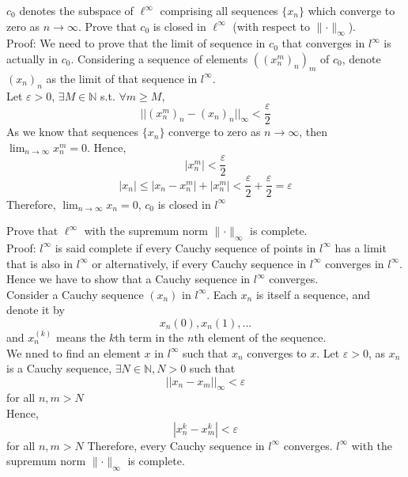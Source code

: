 \documentclass [12pt,letterpaper]{exam}
\begin{document}
\begin{questions}
\question %
$c_0$ denotes the subspace of $\ell^{\infty}$ comprising all sequences $\{ x_n\}$ which converge to zero as $n\to\infty$.
Prove that $c_0$ is closed in $\ell^{\infty}$ (with respect to $\lVert\cdot\rVert_{\infty}$).\\

Proof: We need to prove that the limit of sequence in $c_0$ that converges in $l^\infty$ is actually in $c_0$. Considering a sequence of elements $((x_{n}^{m})_n)_m$ of $c_0$, denote $(x_n)_n$ as the limit of that sequence in $l^\infty$.\\
Let $\varepsilon > 0$, $\exists M \in \mathbb{N}$ s.t. $\forall m \geq M$, 
$$||(x_{n}^{m})_{n} - (x_n)_n||_{\infty} < \frac{\varepsilon}{2}$$
As we know that sequences $\big\{ x_n \big\}$ converge to zero as $n \rightarrow \infty$, then $\lim_{n \rightarrow \infty}x_{n}^{m} = 0$. Hence, $$|x_{n}^{m}| < \frac{\varepsilon}{2}$$
$$|x_n| \leq |x_n - x_{n}^{m}| + |x_{n}^{m}| < \frac{\varepsilon}{2} + \frac{\varepsilon}{2} = \varepsilon$$
Therefore, $\lim_{n \rightarrow \infty}x_n = 0$, $c_0$ is closed in $l^\infty$

\question %
Prove that $\ell^{\infty}$ with the supremum norm $\lVert\cdot\rVert_{\infty}$ is complete.\\

Proof: $l^\infty$ is said complete if every Cauchy sequence of points in $l^\infty$ has a limit that is also in $l^{\infty}$ or alternatively, if every Cauchy sequence in $l^\infty$ converges in $l^\infty$. Hence we have to show that a Cauchy sequence in $l^\infty$ converges.\\
Consider a Cauchy sequence $(x_n)$ in $l^\infty$. Each $x_n$ is itself a sequence, and denote it by $$x_n(0), x_n(1),...$$
and $x_n^(k)$ means the $k$th term in the $n$th element of the sequence.\\
We nned to find an element $x$ in $l^\infty$ such that $x_n$ converges to $x$.
Let $\varepsilon > 0$, as $x_n$ is a Cauchy sequence, $\exists N \in \mathbb{N}, N > 0$ such that $$||x_n - x_m||_\infty < \varepsilon$$
for all $n, m > N$\\
Hence, $$|x_{n}^{k} - x_{m}^{k}| < \varepsilon$$
for all $n, m > N$
Therefore, every Cauchy sequence in $l^\infty$ converges. $l^\infty$ with the supremum norm $\lVert\cdot\rVert_{\infty}$ is complete.


\end{questions}
\end{document}
